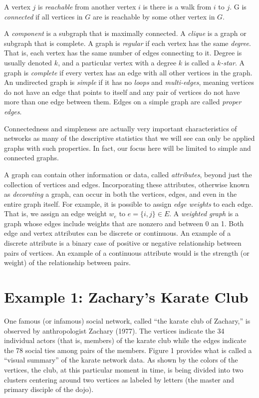 \documentclass[12pt,twoside]{amherstthesis}
\begin{document}
  A vertex \(j\) is \emph{reachable} from another vertex \(i\) is there is
  a walk from \(i\) to \(j\). G is \emph{connected} if all vertices in
  \(G\) are is reachable by some other vertex in \(G\).
  
  A \emph{component} is a subgraph that is maximally connected. A
  \emph{clique} is a graph or subgraph that is complete. A graph is
  \emph{regular} if each vertex has the same \emph{degree}. That is, each
  vertex has the same number of edges connecting to it. Degree is usually
  denoted \(k\), and a particular vertex with a degree \(k\) is called a
  \emph{\(k\)-star}. A graph is \emph{complete} if every vertex has an
  edge with all other vertices in the graph. An undirected graph is
  \emph{simple} if it has no \emph{loops} and \emph{multi-edges}, meaning
  vertices do not have an edge that points to itself and any pair of
  vertices do not have more than one edge between them. Edges on a simple
  graph are called \emph{proper edges}.
  
  Connectedness and simpleness are actually very important characteristics
  of networks as many of the descriptive statistics that we will see can
  only be applied graphs with such properties. In fact, our focus here
  will be limited to simple and connected graphs.
  
  A graph can contain other information or data, called \emph{attributes},
  beyond just the collection of vertices and edges. Incorporating these
  attributes, otherwise known as \emph{decorating} a graph, can occur in
  both the vertices, edges, and even in the entire graph itself. For
  example, it is possible to assign \emph{edge weights} to each edge. That
  is, we assign an edge weight \(w_e\) to \(e = \{i, j\} \in E\). A
  \emph{weighted graph} is a graph whose edges include weights that are
  nonzero and between 0 an 1. Both edge and vertex attributes can be
  discrete or continuous. An example of a discrete attribute is a binary
  case of positive or negative relationship between pairs of vertices. An
  example of a continuous attribute would is the strength (or weight) of
  the relationship between pairs.
  
  \section{Example 1: Zachary's Karate
  Club}\label{example-1-zacharys-karate-club}
  
  One famous (or infamous) social network, called ``the karate club of
  Zachary,'' is observed by anthropologist Zachary (1977). The vertices
  indicate the 34 individual actors (that is, members) of the karate club
  while the edges indicate the 78 social ties among pairs of the members.
  Figure 1 provides what is called a ``visual summary'' of the karate
  network data. As shown by the colors of the vertices, the club, at this
  particular moment in time, is being divided into two clusters centering
  around two vertices as labeled by letters (the master and primary
  disciple of the dojo).
  
\end{document}
